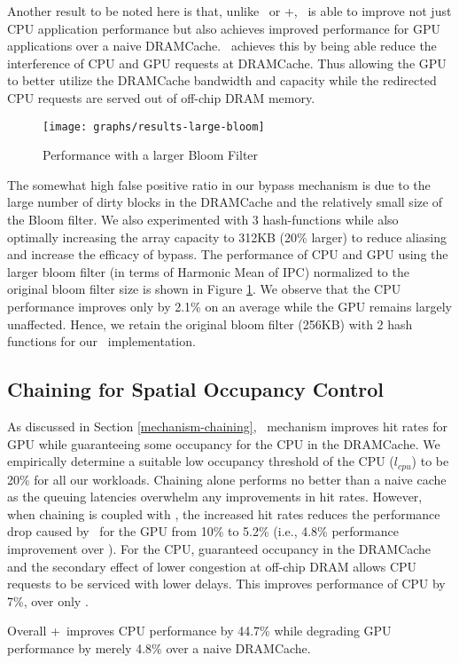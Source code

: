 \par Another result to be noted here is that, unlike \prioname\ or \prioname+\bypassname, \bypassname\ is able to improve not just CPU application performance but also achieves improved performance for GPU applications over a naive DRAMCache. \bypassname\ achieves this by being able reduce the interference of CPU and GPU requests at DRAMCache. Thus allowing the GPU to better utilize the DRAMCache bandwidth and capacity while the redirected CPU requests are served out of off-chip DRAM memory.

\begin{figure}[htb]
	\centering
	\texttt{[image: graphs/results-large-bloom]}
	\caption{Performance with a larger Bloom Filter}
	\label{large-bloom}
\end{figure}

\par The somewhat high false positive ratio in our bypass mechanism is due to the large number of dirty blocks in the DRAMCache and the relatively small size of the Bloom filter.  We also experimented with 3 hash-functions while also optimally increasing the array capacity to 312KB (20\% larger) to reduce aliasing and increase the efficacy of bypass. The performance of CPU and GPU using the larger bloom filter (in terms of Harmonic Mean of IPC) normalized to the original bloom filter size is shown in Figure \ref{large-bloom}. We observe that the CPU performance improves only by 2.1\% on an average while the GPU remains largely unaffected. Hence, we retain the original bloom filter (256KB) with 2 hash functions for our \bypassname\ implementation.

\subsection{Chaining for Spatial Occupancy Control}
As discussed in Section \ref{mechanism-chaining}, \chaining\ mechanism improves hit rates for GPU while guaranteeing some occupancy for the CPU in the DRAMCache. We empirically determine a suitable low occupancy threshold of the CPU (\textit{$l_{cpu}$}) to be 20\% for all our workloads. Chaining alone performs no better than a naive cache as the queuing latencies overwhelm any improvements in hit rates. However, when chaining is coupled with \prioname, the increased hit rates reduces the performance drop caused by \prioname\ for the GPU from 10\% to 5.2\% (i.e., 4.8\% performance improvement over \prioname). For the CPU, guaranteed occupancy in the DRAMCache and the secondary effect of lower congestion at off-chip DRAM allows CPU requests to be serviced with lower delays. This improves performance of CPU by 7\%, over only \prioname.
\par Overall \chaining+\prioname\ improves CPU performance by 44.7\% while degrading GPU performance by merely 4.8\% over a naive DRAMCache.

